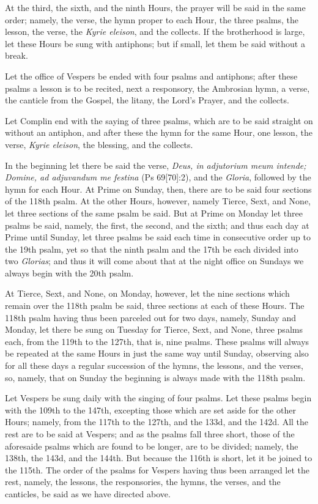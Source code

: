 At the third, the sixth, and the ninth Hours, the prayer will be said in the same order; namely, the verse, the hymn proper to each Hour, the three psalms, the lesson, the verse, the \emph{Kyrie eleison}, and the collects. If the brotherhood is large, let these Hours be sung with antiphons; but if small, let them be said without a break.

Let the office of Vespers be ended with four psalms and antiphons; after these psalms a lesson is to be recited, next a responsory, the Ambrosian hymn, a verse, the canticle from the Gospel, the litany, the Lord's Prayer, and the collects.

Let Complin end with the saying of three psalms, which are to be said straight on without an antiphon, and after these the hymn for the same Hour, one lesson, the verse, \emph{Kyrie eleison}, the blessing, and the collects.


In the beginning let there be said the verse, \emph{Deus, in adjutorium meum intende; Domine, ad adjuvandum me festina} (Ps 69[70]:2), and the \emph{Gloria}, followed by the hymn for each Hour. At Prime on Sunday, then, there are to be said four sections of the 118th psalm. At the other Hours, however, namely Tierce, Sext, and None, let three sections of the same psalm be said. But at Prime on Monday let three psalms be said, namely, the first, the second, and the sixth; and thus each day at Prime until Sunday, let three psalms be said each time in consecutive order up to the 19th psalm, yet so that the ninth psalm and the 17th be each divided into two \emph{Glorias}; and thus it will come about that at the night office on Sundays we always begin with the 20th psalm.

At Tierce, Sext, and None, on Monday, however, let the nine sections which remain over the 118th psalm be said, three sections at each of these Hours. The 118th psalm having thus been parceled out for two days, namely, Sunday and Monday, let there be sung on Tuesday for Tierce, Sext, and None, three psalms each, from the 119th to the 127th, that is, nine psalms. These psalms will always be repeated at the same Hours in just the same way until Sunday, observing also for all these days a regular succession of the hymns, the lessons, and the verses, so, namely, that on Sunday the beginning is always made with the 118th psalm.

Let Vespers be sung daily with the singing of four psalms. Let these psalms begin with the 109th to the 147th, excepting those which are set aside for the other Hours; namely, from the 117th to the 127th, and the 133d, and the 142d. All the rest are to be said at Vespers; and as the psalms fall three short, those of the aforesaide psalms which are found to be longer, are to be divided; namely, the 138th, the 143d, and the 144th. But because the 116th is short, let it be joined to the 115th. The order of the psalms for Vespers having thus been arranged let the rest, namely, the lessons, the responsories, the hymns, the verses, and the canticles, be said as we have directed above.

